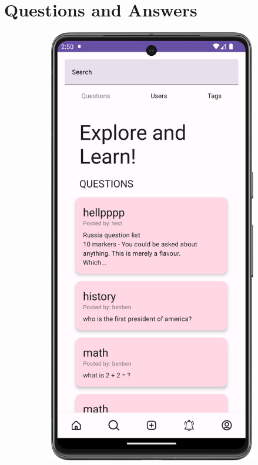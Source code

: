 \section{Questions and Answers}

\begin{figure}[H]
  \begin{subfigure}[b]{0.3\textwidth}
    \includegraphics[width=\textwidth]{Figures/Product_Images/Questions_Answers/questions_page.png}

\end{subfigure}
\end{figure}
